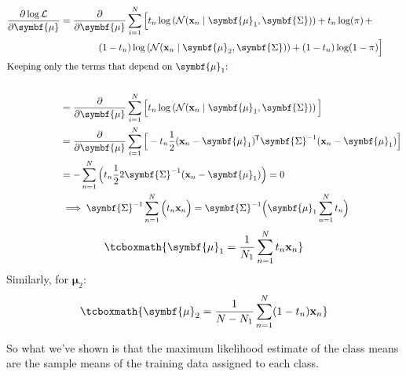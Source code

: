 \documentclass[11pt]{article}
\newcommand{\xb}{\mathbf{x}}
\newcommand{\ub}{\symbf{\mu}}
\newcommand{\Sb}{\symbf{\Sigma}}
\newcommand*{\tran}{^{\mkern-1.5mu\mathsf{T}}}
\begin{document}
\begin{framed}
\begin{align*}
	\frac{\partial \log \mathcal{L}}{\partial \ub} &= \frac{\partial}{\partial \ub}  \sum_{i=1}^{N} \Big[   t_n \log \left(\mathcal{N}(\xb_n \mid \ub_1, \Sb)\right)  + t_n \log(\pi)  \, +  \\
			 & \quad \quad  \quad \quad  (1- t_n) \log \left(\mathcal{N}(\xb_n \mid \ub_2, \Sb)\right)  + (1 - t_n) \log(1 - \pi)  \Big] \\
	\intertext{Keeping only the terms that depend on $\ub_1$:} \\
	&= \frac{\partial}{\partial \ub}  \sum_{i=1}^{N} \Big[   t_n \log \left(\mathcal{N}(\xb_n \mid \ub_1, \Sb)\right)   \Big] \\
	&= \frac{\partial}{\partial \ub}  \sum_{i=1}^{N} \Big[   - t_n  \frac{1}{2} (\xb_n  - \ub_1)\tran \Sb^{-1} (\xb_n  - \ub_1)  \Big] \\
	& = - \sum_{n=1}^{N} \Big(t_n \frac{1}{2}  2  \Sb^{-1} (\xb_n - \ub_1) \Big) = 0 \\
	&\implies \Sb^{-1} \sum_{n=1}^{N} \Big(t_n  \xb_n  \Big) = \Sb^{-1} \Big(  \ub_1  \sum_{n=1}^{N} t_n \Big)
\end{align*}
\begin{equation}
	\tcboxmath{\ub_1 = \frac{1}{N_1} \sum_{n=1}^N t_n \xb_n} 
\end{equation}
Similarly, for $\ub_2$:
\begin{equation}
	\tcboxmath{\ub_2 = \frac{1}{N - N_1} \sum_{n=1}^N (1 - t_n) \xb_n}
\end{equation}

So what we've shown is that the maximum likelihood estimate of the class means are the sample means of the training data assigned to each class.


\end{framed}
\end{document}
